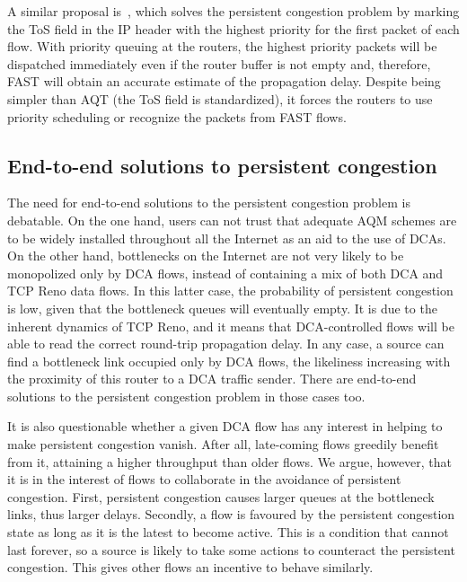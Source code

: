 \documentclass[english,times]{ettauth}
\begin{document}
A similar proposal is~\cite{Tan05}, which solves the persistent congestion
problem by marking the ToS field in the IP header with the highest priority
for the first packet of each flow. With priority queuing at the routers, the
highest priority packets will be dispatched immediately even if the router
buffer is not empty and, therefore, FAST will obtain an accurate estimate of
the propagation delay. Despite being simpler than AQT (the ToS field is
standardized), it forces the routers to use priority scheduling or recognize
the packets from FAST flows.


\subsection{End-to-end solutions to persistent congestion}
\label{sec:end-end-solutions}

The need for end-to-end solutions to the persistent congestion problem is
debatable. On the one hand, users can not trust that adequate AQM schemes are
to be widely installed throughout all the Internet as an aid to the use of
DCAs. On the other hand, bottlenecks on the Internet are not very likely to be
monopolized only by DCA flows, instead of containing a mix of both DCA and TCP
Reno data flows. In this latter case, the probability of persistent congestion
is low, given that the bottleneck queues will eventually empty. It is due to
the inherent dynamics of TCP Reno, and it means that DCA-controlled flows will
be able to read the correct round-trip propagation delay. In any case, a
source can find a bottleneck link occupied only by DCA flows, the likeliness
increasing with the proximity of this router to a DCA traffic sender. There
are end-to-end solutions to the persistent congestion problem in those cases
too.

It is also questionable whether a given DCA flow has any interest in helping
to make persistent congestion vanish. After all, late-coming flows greedily
benefit from it, attaining a higher throughput than older flows. We argue,
however, that it is in the interest of flows to collaborate in the avoidance
of persistent congestion. First, persistent congestion causes larger queues at
the bottleneck links, thus larger delays. Secondly, a flow is favoured by the
persistent congestion state as long as it is the latest to become active. This
is a condition that cannot last forever, so a source is likely to take some
actions to counteract the persistent congestion. This gives other flows an
incentive to behave similarly.
\end{document}
